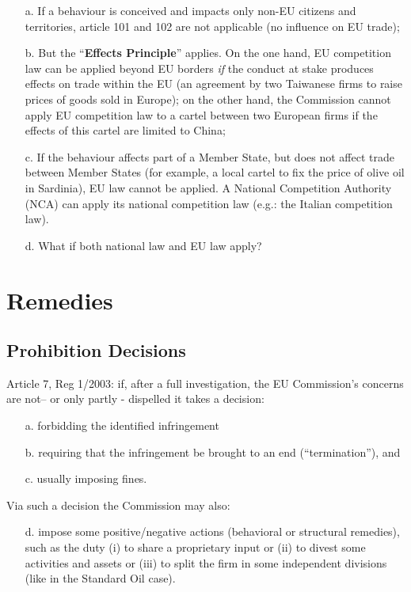     \begin{itemize}
        \item[a.] If a behaviour is conceived and impacts only non-EU citizens and territories, article 101 and 102 are not applicable (no influence on EU trade);
        \item[b.] But the “\textbf{Effects Principle}” applies. On the one hand, EU competition law can be applied beyond EU borders \textit{if} the conduct at stake produces effects on trade within the EU (an agreement by two Taiwanese firms to raise prices of goods sold in Europe); on the other hand, the Commission cannot apply EU competition law to a cartel between two European firms if the effects of this cartel are limited to China;
        \item[c.]  If the behaviour affects part of a Member State, but does not affect trade between Member States (for example, a local cartel to fix the price of olive oil in Sardinia), EU law cannot be applied. A National Competition Authority (NCA) can apply its national competition law (e.g.: the Italian competition law).
        \item[d.] What if both national law and EU law apply?
    \end{itemize}

\section{Remedies}

    \subsection{Prohibition Decisions}

        Article 7, Reg 1/2003: if, after a full investigation, the EU Commission's concerns are not– or only partly - dispelled it takes a decision: 
        \begin{itemize}
            \item[a.] forbidding the identified infringement
            \item[b.] requiring that the infringement be brought to an end (“termination”), and
            \item[c. ]usually imposing fines. 
        \end{itemize}

        Via such a decision the Commission may also:
        \begin{itemize}
            \item[d.] impose some positive/negative actions (behavioral or structural remedies), such as the duty (i) to share a proprietary input or (ii) to divest some activities and assets or (iii) to split the firm in some independent divisions (like in the Standard Oil case).
        \end{itemize}

